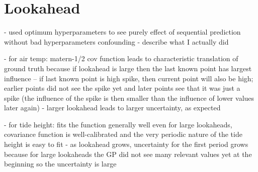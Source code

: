 \documentclass{article}
\begin{document}
    \section{Lookahead}
            - used optimum hyperparameters to see purely effect of sequential prediction without bad hyperparameters confounding
            - describe what I actually did

            - for air temp: matern-1/2 cov function leads to characteristic translation of ground truth because if lookahead is large then the last known point has largest influence -- if last known point is high spike, then current point will also be high; earlier points did not see the spike yet and later points see that it was just a spike (the influence of the spike is then smaller than the influence of lower values later again)
            - larger lookahead leads to larger uncertainty, as expected

            - for tide height: fits the function generally well even for large lookaheads, covariance function is well-calibrated and the very periodic nature of the tide height is easy to fit
            - as lookahead grows, uncertainty for the first period grows because for large lookaheads the GP did not see many relevant values yet at the beginning so the uncertainty is large
\end{document}
